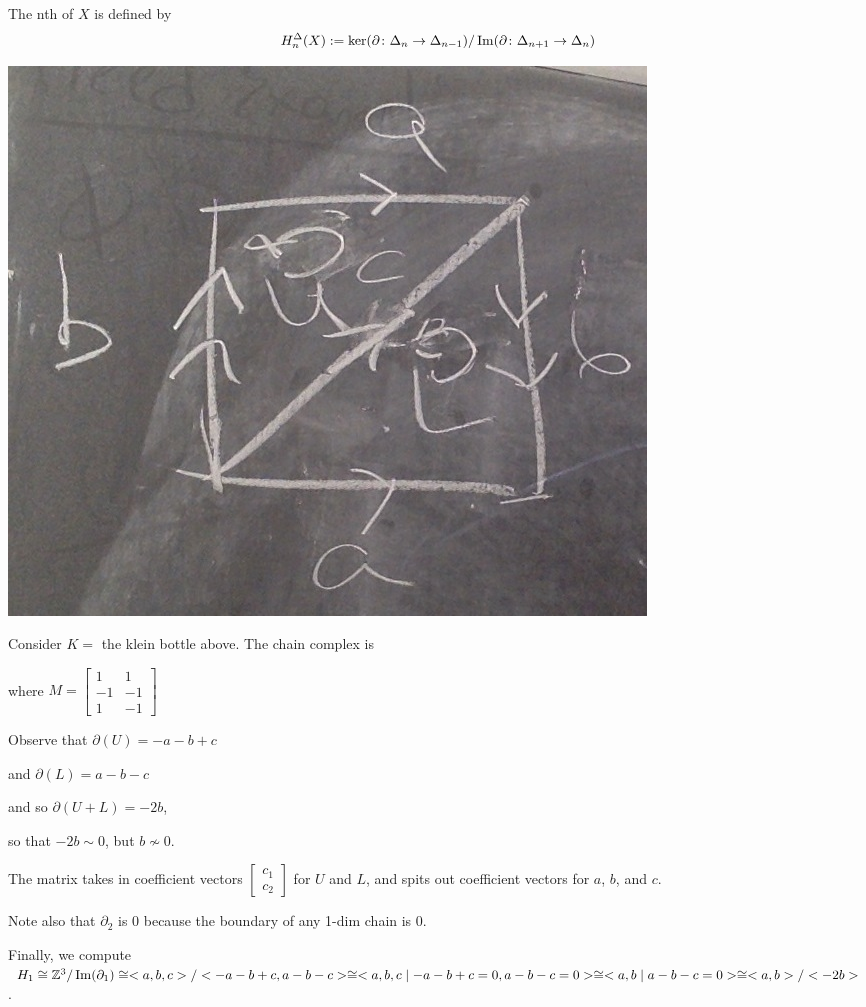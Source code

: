 \documentclass[11pt,leqno,oneside]{amsart}
\numberwithin{thm}{section}
\renewcommand{\d}{\partial}
\begin{document}
\begin{defn}
  The nth  of $X$ is defined by
  $$H_n^\Delta(X) := \ker(\d \from \Delta_n \to \Delta_{n-1})/\im(\d \from \Delta_{n+1} \to \Delta_{n})$$
\end{defn}

\begin{example}
  \includegraphics[scale=0.2]{images/klein-bottle-CW}

  Consider $K =$ the klein bottle above.  The chain complex is


  where $M = \begin{bmatrix}
    1 &1 \\
    -1 &-1 \\
    1 &-1
  \end{bmatrix}$


  Observe that $\d(U) = -a -b +c$

  and $\d(L) = a - b - c$

  and so $\d(U + L) = -2b$,

  so that $-2b \sim 0$, but $b \not\sim 0$.

  The matrix takes in coefficient vectors $\begin{bmatrix}c_1 \\ c_2\end{bmatrix}$ for $U$ and $L$, and spits out coefficient vectors for $a$, $b$, and $c$.

  Note also that $\d_2$ is 0 because the boundary of any 1-dim chain is 0.

  Finally, we compute $H_1 \isom \Z^3 / \im(\d_1) \isom <a,b,c>/<-a-b+c, a-b-c> \isom <a,b,c \st -a-b+c = 0, a-b-c = 0> \isom <a,b \st a-b-c = 0> \isom <a,b>/<-2b>$.


\end{example}
\end{document}
